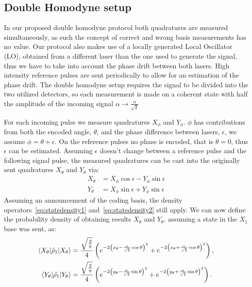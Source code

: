 \documentclass[a4paper]{article}
\begin{document}
\subsection{Double Homodyne setup}

In our proposed double homodyne protocol both quadratures are measured simultaneously, as such the concept of correct and wrong basis measurements has no value. Our protocol also makes use of a locally generated Local Oscillator (LO), obtained from a different laser than the one used to generate the signal, thus we have to take into account the phase drift between both lasers. High intensity reference pulses are sent periodically to allow for an estimation of the phase drift. The double homodyne setup requires the signal to be divided into the two utilized detectors, so each measurement is made on a coherent state with half the amplitude of the incoming signal $\alpha\rightarrow\frac{\alpha}{\sqrt{2}}$
\par
For each incoming pulse we measure quadratures $X_\phi$ and $Y_\phi$. $\phi$ has contributions from both the encoded angle, $\theta$, and the phase difference between lasers, $\epsilon$, we assume $\phi=\theta+\epsilon$. On the reference pulses no phase is encoded, that is $\theta=0$, thus $\epsilon$ can be estimated. Assuming $\epsilon$ doesn't change between a reference pulse and the following signal pulse, the measured quadratures can be cast into the originally sent quadratures $X_\theta$ and $Y_\theta$ via:
\begin{equation}
\begin{aligned}
X_\theta&=X_\phi\cos\epsilon-Y_\phi\sin\epsilon\\
Y_\theta&=X_\phi\sin\epsilon+Y_\phi\sin\epsilon
\end{aligned}
\end{equation}
Assuming an announcement of the coding basis, the density operators~\eqref{eq:statedensity1} and~\eqref{eq:statedensity2} still apply. We can now define the probability density of obtaining results $X_\theta$ and $Y_\theta$, assuming a state in the $X_1$ base was sent, as:
\begin{align}
\braket{X_\theta|\hat{\rho}_1|X_\theta}&= \frac{\sqrt{\frac{2}{\pi}}}{4}\left(e^{-2\left(x_\theta-\frac{\alpha}{\sqrt{2}}\cos\theta\right)^2}+e^{-2\left(x_\theta+\frac{\alpha}{\sqrt{2}}\cos\theta\right)^2}\right),\\
\braket{Y_\theta|\hat{\rho_1}|Y_\theta}&= \frac{\sqrt{\frac{2}{\pi}}}{4}\left(e^{-2\left(y_\theta-\frac{\alpha}{\sqrt{2}}\sin\theta\right)^2}+e^{-2\left(y_\theta+\frac{\alpha}{\sqrt{2}}\sin\theta\right)^2}\right).
\end{align}
\end{document}
